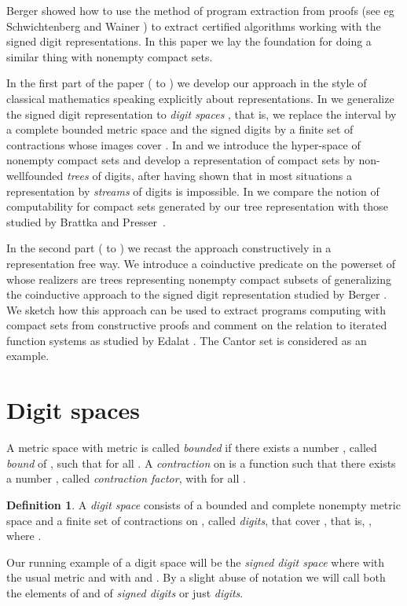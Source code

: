 \documentclass[microtype]{jloganal}
\theoremstyle{plain}
\theoremstyle{definition}
\newtheorem{definition}[theorem]{Definition}
\begin{document}
Berger \cite{Berger11} showed how to use the method of program extraction 
from proofs 
(see eg Schwichtenberg and Wainer \cite{SchwichtenbergWainer12})
to extract certified algorithms 
working with the signed digit representations. 
In this paper we lay the foundation for doing a similar
thing with nonempty compact sets. 


In the first part of the paper 
( to ) 
we develop our approach in the style of classical mathematics 
speaking explicitly about representations. 
In  we generalize the signed digit representation to 
\emph{digit spaces} , that is, we replace the interval  
by a complete bounded metric space  and the signed digits by a 
finite set  of contractions whose images cover .
In  and  we introduce the hyper-space
of nonempty compact sets and develop a representation of compact sets by non-wellfounded 
\emph{trees} of digits, after having shown that in most situations a representation by
\emph{streams} of digits is impossible.
In  we compare the notion of computability for compact sets 
generated by our tree representation with those studied by Brattka and Presser~\cite{BrattkaPresser03}.

In the second part
( to ) we recast the approach constructively 
in a representation free way.
We introduce a coinductive predicate on the powerset of  whose realizers 
are trees representing nonempty compact subsets of  generalizing the
coinductive approach to the signed digit representation studied by Berger \cite{Berger11}.
We sketch how this approach can be used to extract programs computing
with compact sets from constructive proofs and comment on the relation to 
iterated function systems as studied by Edalat \cite{Edalat97}. The Cantor set is considered as an example.

\section{Digit spaces}
\label{sec-digit-space}
A metric space  with metric  is called \emph{bounded} if there exists
a number , called \emph{bound} of , such that
 for all .  
A \emph{contraction} on  is a function  such that there exists 
a number , called \emph{contraction factor}, with  
 for all . 
\begin{definition}
\label{def-digit-space}
A \emph{digit space}  consists of
a bounded and complete nonempty metric space  and a 
finite set  of contractions on , called \emph{digits}, 
that cover , that is, , where . 
\end{definition}
Our running example of a digit space will be the \emph{signed digit space}
 where  with the 
usual metric and  with 
 and .
By a slight abuse of notation we will call both the elements of  and of 
 \emph{signed digits} or just \emph{digits}.
\end{document}
